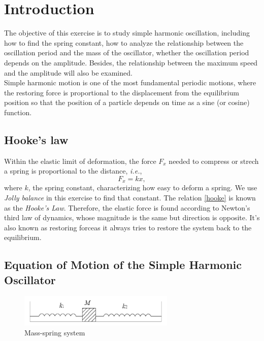 \section{Introduction}
    The objective of this exercise is to study simple harmonic oscillation, including how to find the spring constant, how to analyze the relationship between the oscillation period and the mass of the oscillator, whether the oscillation period depends on the amplitude. Besides, the relationship between the maximum speed and the amplitude will also be examined.\\
    Simple harmonic motion is one of the most fundamental periodic motions, where the restoring force is proportional to the displacement from the equilibrium position so that the position of a particle depends on time as a sine (or cosine) function.\\
\subsection{Hooke's law}
    Within the elastic limit of deformation, the force $F_x$ needed to compress or strech a spring is proportional to the distance, \emph{i.e.},
    \begin{equation}
        \label{hooke}
        F_x=kx,
    \end{equation}
    where $k$, the spring constant, characterizing how easy to deform a spring. We use \emph{Jolly balance} in this exercise to find that constant. The relation \ref{hooke} is known as the \emph{Hooke's Law}. Therefore, the elastic force is found according to Newton's third law of dynamics, whose magnitude is the same but direction is opposite. It's also known as restoring forceas it always tries to restore the system back to the equilibrium.\\

\subsection{Equation of Motion of the Simple Harmonic Oscillator}
    \begin{figure}[htbp]
        \label{massspring}
        \centering
        \includegraphics[height=0.6in]{images/1.png}
        \caption{Mass-spring system}
    \end{figure}

